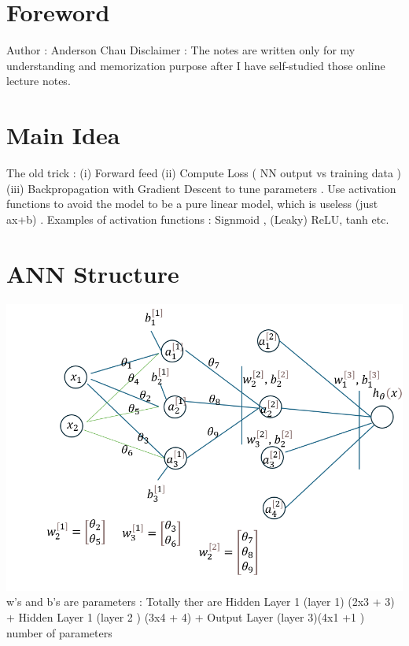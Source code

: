 \documentclass{article}
\begin{document}
\section{Foreword}
Author : Anderson Chau
\newline 
\newline 
Disclaimer : The notes are written only for my understanding and memorization purpose after I have self-studied those online lecture notes. 

\section{Main Idea}
The old trick : (i) Forward feed (ii) Compute Loss ( NN output vs training data ) (iii) Backpropagation with Gradient Descent to tune parameters . Use activation functions to avoid the model to be a pure linear model, which is useless (just ax+b) .  Examples of activation functions : Signmoid , (Leaky) ReLU, tanh etc. \newline
\section{ANN Structure}
\includegraphics{diagram1}
w's and b's are parameters : Totally ther are Hidden Layer 1 (layer 1) (2x3 + 3) + Hidden Layer 1  (layer 2 ) (3x4 + 4) + Output Layer (layer 3)(4x1 +1 ) number of parameters    
\end{document}
